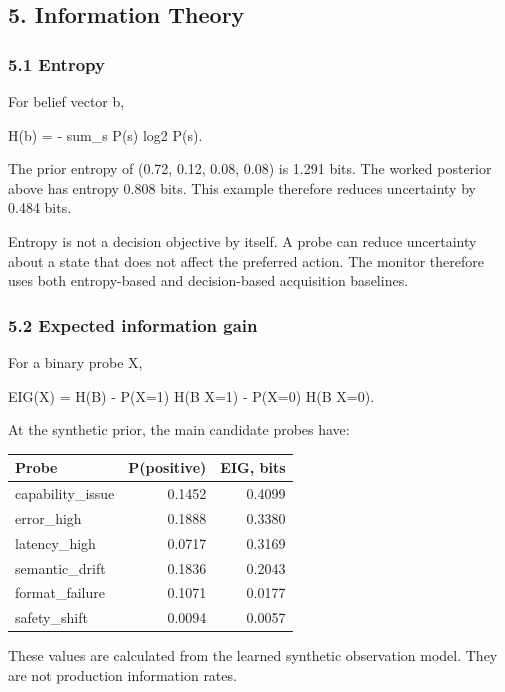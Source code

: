 \documentclass[
]{article}
\begin{document}
\subsection{5. Information Theory}\label{5-information-theory}

\subsubsection{5.1 Entropy}\label{51-entropy}

For belief vector b,

H(b) = - sum\_s P(s) log2 P(s).

The prior entropy of (0.72, 0.12, 0.08, 0.08) is 1.291 bits. The worked posterior above has entropy 0.808 bits. This example therefore reduces uncertainty by 0.484 bits.

Entropy is not a decision objective by itself. A probe can reduce uncertainty about a state that does not affect the preferred action. The monitor therefore uses both entropy-based and decision-based acquisition baselines.

\subsubsection{5.2 Expected information gain}\label{52-expected-information-gain}

For a binary probe X,

EIG(X) = H(B) - P(X=1) H(B \textbar{} X=1) - P(X=0) H(B \textbar{} X=0).

At the synthetic prior, the main candidate probes have:

\begin{longtable}[]{@{}lrr@{}}
\toprule\noalign{}
Probe & P(positive) & EIG, bits \\
\midrule\noalign{}
\endhead
\bottomrule\noalign{}
\endlastfoot
capability\_issue & 0.1452 & 0.4099 \\
error\_high & 0.1888 & 0.3380 \\
latency\_high & 0.0717 & 0.3169 \\
semantic\_drift & 0.1836 & 0.2043 \\
format\_failure & 0.1071 & 0.0177 \\
safety\_shift & 0.0094 & 0.0057 \\
\end{longtable}

These values are calculated from the learned synthetic observation model. They are not production information rates.
\end{document}
